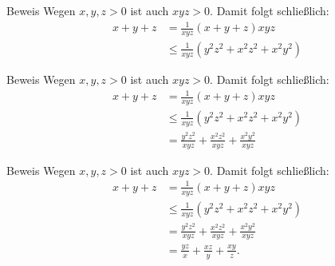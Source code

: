 \documentclass[10pt]{beamer}
\begin{document}
\begin{frame}{Beweis}
    Wegen \( x, y, z > 0 \) ist auch \( xyz > 0 \). Damit folgt schließlich:
    \begin{align*}
        x + y + z
        & = \frac{1}{xyz} \left( x + y + z \right) xyz \\
        & \leq \frac{1}{xyz} \left( y^{2}z^{2} + x^{2}z^{2} + x^{2}y^{2} \right)
    \end{align*}
\end{frame}



\begin{frame}{Beweis}
    Wegen \( x, y, z > 0 \) ist auch \( xyz > 0 \). Damit folgt schließlich:
    \begin{align*}
        x + y + z
        & = \frac{1}{xyz} \left( x + y + z \right) xyz \\
        & \leq \frac{1}{xyz} \left( y^{2}z^{2} + x^{2}z^{2} + x^{2}y^{2} \right) \\
        & = \frac{y^{2}z^{2}}{xyz} + \frac{x^{2}z^{2}}{xyz} + \frac{x^{2}y^{2}}{xyz}
    \end{align*}
\end{frame}



\begin{frame}{Beweis}
    Wegen \( x, y, z > 0 \) ist auch \( xyz > 0 \). Damit folgt schließlich:
    \begin{align*}
        x + y + z
        & = \frac{1}{xyz} \left( x + y + z \right) xyz \\
        & \leq \frac{1}{xyz} \left( y^{2}z^{2} + x^{2}z^{2} + x^{2}y^{2} \right) \\
        & = \frac{y^{2}z^{2}}{xyz} + \frac{x^{2}z^{2}}{xyz} + \frac{x^{2}y^{2}}{xyz} \\
        & = \frac{yz}{x} + \frac{xz}{y} + \frac{xy}{z}.
    \end{align*}
\end{frame}
\end{document}
